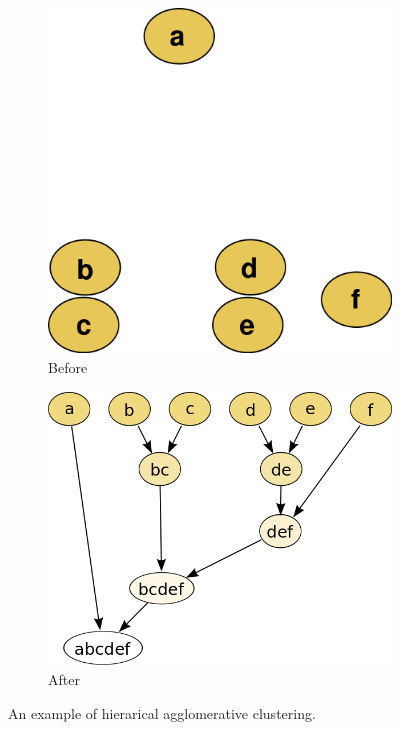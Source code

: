\begin{figure}[htb]
  \centering
  \begin{subfigure}[b]{0.40\textwidth} 
    \centering
    \includegraphics[width=\textwidth]{figures/dendrogram1.png}
    \caption{Before}
  \end{subfigure}
  \hspace{0.10\textwidth}
  \begin{subfigure}[b]{0.40\textwidth}
	\centering
    \includegraphics[width=\textwidth]{figures/dendrogram2.png}
    \caption{After}
  \end{subfigure}
  \caption{An example of hierarical agglomerative clustering.}
  \label{fig:hac}
\end{figure}

